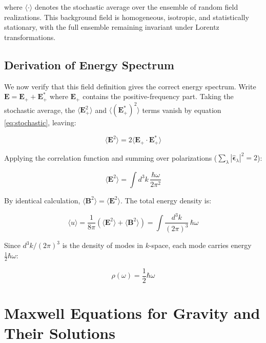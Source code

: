 \documentclass {article}
\renewcommand\vec{\mathbf}
\let\OldHat\hat
\renewcommand{\hat}[1]{\OldHat{\mathbf{#1}}}
\begin{document}
\noindent where $\langle \cdot \rangle$ denotes the stochastic average over the ensemble of random field realizations. This background field is homogeneous, isotropic, and statistically stationary, with the full ensemble remaining invariant under Lorentz transformations.

\subsection{Derivation of Energy Spectrum}


We now verify that this field definition gives the correct energy spectrum. Write $\vec{E} = \vec{E}_+ + \vec{E}_+^*$ where $\vec{E}_+$ contains the positive-frequency part. Taking the stochastic average, the $\langle \vec{E}_+^2 \rangle$ and $\langle (\vec{E}_+^*)^2 \rangle$ terms vanish by equation \eqref{eq:stochastic}, leaving:

\begin{equation}
\langle \vec{E}^2 \rangle = 2\langle \vec{E}_+ \cdot \vec{E}_+^* \rangle
\end{equation}

\noindent Applying the correlation function and summing over polarizations ($\sum_\lambda |\hat{\epsilon}_\lambda|^2 = 2$):

\begin{equation}
\langle \vec{E}^2 \rangle = \int d^3k \, \frac{\hbar\omega}{2\pi^2}
\end{equation}

\noindent By identical calculation, $\langle \vec{B}^2 \rangle = \langle \vec{E}^2 \rangle$. The total energy density is:

\begin{equation}
\langle u \rangle = \frac{1}{8\pi}(\langle \vec{E}^2 \rangle + \langle \vec{B}^2 \rangle)
= \int \frac{d^3k}{(2\pi)^3} \, \hbar\omega
\label{eq:energy_per_mode_integral}
\end{equation}

\noindent Since $d^3k/(2\pi)^3$ is the density of modes in $k$-space, each mode carries energy $\frac{1}{2}\hbar\omega$:

\begin{equation}
\rho(\omega) = \frac{1}{2} \hbar \omega
\label{eq:energy_per_mode}
\end{equation}


\section{Maxwell Equations for Gravity and Their Solutions}
\label{subsec:max}
\end{document}

